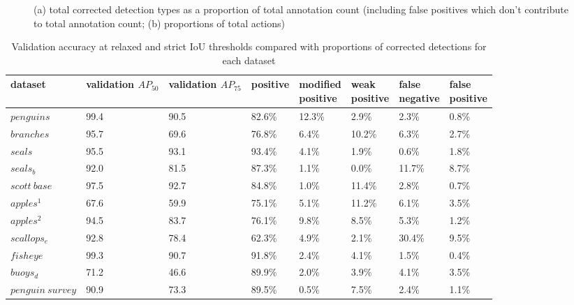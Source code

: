 \begin{figure}[H]
\caption {(a) total corrected detection types as a proportion of total annotation count (including false positives which don't contribute to total annotation count; (b) proportions of total actions)}
\label{fig:actions_dataset}
\end{figure}

\begin{table}[h!]
\caption{Validation accuracy at relaxed and strict IoU thresholds compared with proportions of corrected detections for each dataset}
\label{fig:validation_corrections}
\begin{tabular}{llllllll}
dataset           & \shortstack{validation \\ $AP_{50}$} & \shortstack{validation  \\ $AP_{75}$} & positive & \shortstack{modified\\ positive} & \shortstack{weak\\ positive} & \shortstack{false \\ negative} & \shortstack{false \\ positive} \\
\toprule
$penguins$        & 99.4      & 90.5      & 82.6\%   & 12.3\%            & 2.9\%         & 2.3\%          & 0.8\%          \\
$branches$        & 95.7      & 69.6      & 76.8\%   & 6.4\%             & 10.2\%        & 6.3\%          & 2.7\%          \\
$seals$           & 95.5      & 93.1      & 93.4\%   & 4.1\%             & 1.9\%         & 0.6\%          & 1.8\%          \\
$seals_b$         & 92.0      & 81.5      & 87.3\%   & 1.1\%             & 0.0\%         & 11.7\%         & 8.7\%          \\
$scott\:base$     & 97.5      & 92.7      & 84.8\%   & 1.0\%             & 11.4\%        & 2.8\%          & 0.7\%          \\
$apples^1$        & 67.6      & 59.9      & 75.1\%   & 5.1\%             & 11.2\%        & 6.1\%          & 3.5\%          \\
$apples^2$        & 94.5      & 83.7      & 76.1\%   & 9.8\%             & 8.5\%         & 5.3\%          & 1.2\%          \\
$scallops_e$      & 92.8      & 78.4      & 62.3\%   & 4.9\%             & 2.1\%         & 30.4\%         & 9.5\%          \\
$fisheye$         & 99.3      & 90.7      & 91.8\%   & 2.4\%             & 4.1\%         & 1.5\%          & 0.4\%          \\
$buoys_d$         & 71.2      & 46.6      & 89.9\%   & 2.0\%             & 3.9\%         & 4.1\%          & 3.5\%          \\
$penguin\:survey$ & 90.9      & 73.3      & 89.5\%   & 0.5\%             & 7.5\%         & 2.4\%          & 1.1\%        \\
\bottomrule
\end{tabular}
\end{table}



